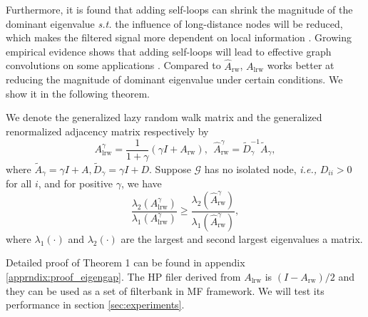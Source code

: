 \documentclass{article}
\newcommand\ie{\textit{i.e.,}}
\newcommand\st{\textit{s.t.}}
\newcommand{\0}{{\boldsymbol{0}}}
\newcommand{\6}{{\partial}}
\newcommand{\8}{{\infty}}
\newcommand{\4}{{\nabla}}
\newenvironment{theorem}[2][Theorem]{\begin{trivlist}
		\item[\hskip \labelsep {\bfseries #1}\hskip \labelsep {\bfseries #2.}]}{\end{trivlist}}
\begin{document}
Furthermore, it is found that adding self-loops can shrink the magnitude of the dominant eigenvalue \st{} the influence of long-distance nodes will be reduced, which makes the filtered signal more dependent on local information \cite{hamilton2020graph}. Growing empirical evidence shows that adding self-loops will lead to effective graph convolutions on some applications \cite{klicpera2018predict, wu2019simplifying}. Compared to $\hat{A}_\text{rw}$, $A_{\text{lrw}}$ works better at reducing the magnitude of dominant eigenvalue under certain conditions. We show it in the following theorem.
\begin{theorem} 1
We denote the generalized lazy random walk matrix and  the generalized renormalized adjacency matrix 
respectively by 
$$
A_{\text{lrw}}^\gamma = \frac{1}{1+\gamma}(\gamma I + A_{\text{rw}}),\ \ 
\hat{A}_{\text{rw}}^\gamma = \tilde{D}_\gamma^{-1} \tilde{A}_\gamma,
$$
where $\tilde{A}_\gamma = \gamma I + A, \tilde{D}_\gamma = \gamma I + D$. Suppose $\mathcal{G}$ has no isolated node, \ie{} $D_{ii} > 0$ for all $i$, and for positive $\gamma$, we have
\begin{equation}
    \frac{\lambda_2(A_{\text{lrw}}^\gamma)}{\lambda_1(A_{\text{lrw}}^\gamma)} \geq \frac{\lambda_2(\hat{A}_{\text{rw}}^\gamma)}{\lambda_1(\hat{A}_{\text{rw}}^\gamma)}, \end{equation}
where $\lambda_1(\cdot)$ and $\lambda_2(\cdot)$ are the largest and second largest eigenvalues a matrix.
\end{theorem}
Detailed proof of Theorem 1 can be found in appendix \ref{apprndix:proof_eigengap}.
The HP filer derived from $A_{\text{lrw}}$ is $(I-A_{\text{rw}})/2$ and they can be used as a set of filterbank in MF framework. We will test its performance in section \ref{sec:experiments}.
\fi
\end{document}
